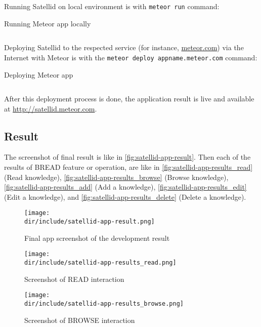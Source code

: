 Running Satellid on local environment is with \verb|meteor run| command:

\begin{listing}[h]
\caption{Running Meteor app locally}
\inputminted{shell-session}{\dir/include/satellid-meteor-run.shell-session}
\label{lst:satellid-run}
\end{listing}

Deploying Satellid to the respected service (for instance, \url{meteor.com}) via the Internet with Meteor is with the \verb|meteor deploy appname.meteor.com| command:

\begin{listing}[h]
\caption{Deploying Meteor app}
\inputminted{shell-session}{\dir/include/satellid-meteor-deploy.shell-session}
\label{lst:satellid-deploy}
\end{listing}

After this deployment process is done, the application result is live and available at \url{http://satellid.meteor.com}.

\subsection{Result}

The screenshot of final result is like in \autoref{fig:satellid-app-result}.
Then each of the results of \ac{BREAD} feature or operation, are like in
\autoref{fig:satellid-app-results_read} (Read knowledge),
\autoref{fig:satellid-app-results_browse} (Browse knowledge),
\autoref{fig:satellid-app-results_add} (Add a knowledge),
\autoref{fig:satellid-app-results_edit} (Edit a knowledge), and
\autoref{fig:satellid-app-results_delete} (Delete a knowledge).

\begin{figure}[!htp]
  \centering
  \texttt{[image: \\dir/include/satellid-app-result.png]}
  \caption{Final app screenshot of the development result}
  \label{fig:satellid-app-result}
\end{figure}

\begin{figure}[!htp]
  \centering
  \texttt{[image: \\dir/include/satellid-app-results\_read.png]}
  \caption{Screenshot of READ interaction}
  \label{fig:satellid-app-results_read}
\end{figure}

\begin{figure}[!htp]
  \centering
  \texttt{[image: \\dir/include/satellid-app-results\_browse.png]}
  \caption{Screenshot of BROWSE interaction}
  \label{fig:satellid-app-results_browse}
\end{figure}

